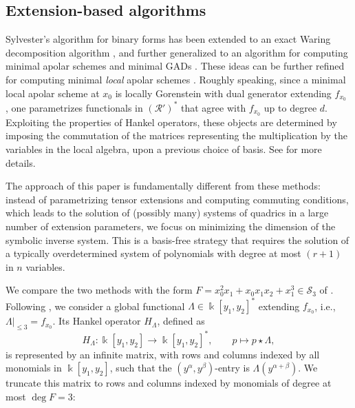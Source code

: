 \documentclass{amsart}
\theoremstyle{plain}
\renewcommand{\k}{\Bbbk}
\renewcommand{\S}{\mathcal{S}}
\def\a{\alpha}
\def\b{\beta}
\def\R{\mathcal{R}}
\numberwithin{equation}{section}
\begin{document}
\subsection{Extension-based algorithms}
Sylvester's algorithm for binary forms has been extended to an exact Waring decomposition algorithm \cite{BCMT10}, and further generalized to an algorithm for computing minimal apolar schemes \cite{BT20} and minimal GADs \cite{BMT25}.
These ideas can be further refined for computing minimal \emph{local} apolar schemes \cite{BF25}.
Roughly speaking, since a minimal local apolar scheme at $x_0$ is locally Gorenstein \cite{BB14} with dual generator extending $f_{x_0}$ \cite{BJMR18}, one parametrizes functionals in $(\R')^*$ that agree with $f_{x_0}$ up to degree $d$.
Exploiting the properties of Hankel operators, these objects are determined by imposing the commutation of the matrices representing the multiplication by the variables in the local algebra, upon a previous choice of basis.
See \cite[Section 6]{BT20} for more details.

The approach of this paper is fundamentally different from these methods: instead of parametrizing tensor extensions and computing commuting conditions, which leads to the solution of (possibly many) systems of quadrics in a large number of extension parameters, we focus on minimizing the dimension of the symbolic inverse system.
This is a basis-free strategy that requires the solution of a typically overdetermined system of polynomials with degree at most $(r+1)$ in $n$ variables.

We compare the two methods with the form $F = x_0^2x_1 + x_0x_1x_2 + x_1^3 \in \S_3$ of . %
Following \cite[Algorithm 3]{BT20}, we consider a global functional $\Lambda\in \k[y_1,y_2]^*$ extending $f_{x_0}$, i.e., $\Lambda|_{\leq 3}=f_{x_0}$.
Its Hankel operator $H_{\Lambda}$, defined as 
\[H_\Lambda: \k[y_1,y_2] \to \k[y_1,y_2]^*, \qquad p\mapsto p\star \Lambda,\]
is represented by an infinite matrix, with rows and columns indexed by all monomials in $\k[y_1,y_2]$, such that the $(y^\a,y^\b)$-entry is $\Lambda(y^{\alpha+\beta})$.
We truncate this matrix to rows and columns indexed by monomials of degree at most $\deg F=3$: 
\end{document}
